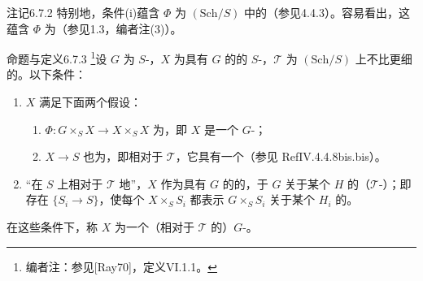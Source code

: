 \begin{SGAresult}{注记}{6.7.2}
特别地，条件(i)蕴含 $\Phi$ 为 $(\mathrm{Sch}/S)$ 中的（参见4.4.3）。容易看出，这蕴含 $\Phi$ 为（参见1.3，编者注(3)）。
\end{SGAresult}
\begin{SGAresult}{命题与定义}{6.7.3}
\footnote{编者注：参见[Ray70]，定义VI.1.1。}设 $G$ 为 $S$-，$X$ 为具有 $G$ 的的 $S$-，$\mathcal T$ 为 $(\mathrm{Sch}/S)$ 上不比更细的。以下条件：
\begin{enumerate}
\item[(i)] $X$ 满足下面两个假设：
\begin{enumerate}
\item[(1)]  $\Phi:G\times_S X\to X\times_S X$ 为，即 $X$ 是一个 $G$-；
\item[(2)]  $X\to S$ 也为，即相对于 $\mathcal T$，它具有一个（参见 RefIV.4.4.8bis.bis）。
\end{enumerate}
\item[(ii)] “在 $S$ 上相对于 $\mathcal T$ 地”，$X$ 作为具有 $G$ 的的，于 $G$ 关于某个 $H$ 的（$\mathcal T$-）；即存在 $\{S_i\to S\}$，使每个 $X\times_S S_i$ 都表示 $G\times_S S_i$ 关于某个 $H_i$ 的。
\end{enumerate}
在这些条件下，称 $X$ 为一个（相对于 $\mathcal T$ 的）$G$-。
\end{SGAresult}
